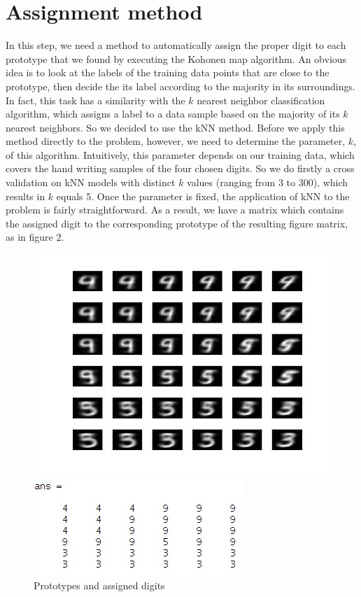 \documentclass[a4paper, 12pt]{article}
\begin{document}
\section{Assignment method}
In this step, we need a method to automatically assign the proper digit to each prototype that we found by executing the Kohonen map algorithm. An obvious idea is to look at the labels of the training data points that are close to the prototype, then decide the its label according to the majority in its surroundings. In fact, this task has a similarity with the $k$ nearest neighbor classification algorithm, which assigns a label to a data sample based on the majority of its $k$ nearest neighbors. So we decided to use the kNN method.
Before we apply this method directly to the problem, however, we need to determine the parameter, $k$, of this algorithm. Intuitively, this parameter depends on our training data, which covers the hand writing samples of the four chosen digits. So we do firstly a cross validation on kNN models with distinct $k$ values (ranging from 3 to 300), which results in $k$ equals 5.
Once the parameter is fixed, the application of kNN to the problem is fairly straightforward.
As a result, we have a matrix which contains the assigned digit to the corresponding prototype of the resulting figure matrix, as in figure 2.
\begin{figure}
  \centering
  \begin{minipage}[c]{0.5\textwidth}
    \centering
    \includegraphics[scale=0.4]{../figure/assign.jpg}
  \end{minipage}%
  \begin{minipage}[c]{0.5\textwidth}
    \centering
    \includegraphics[scale=0.8]{../figure/assignMatrix.jpg}
  \end{minipage}
  \caption{Prototypes and assigned digits}
\end{figure}
\end{document}
